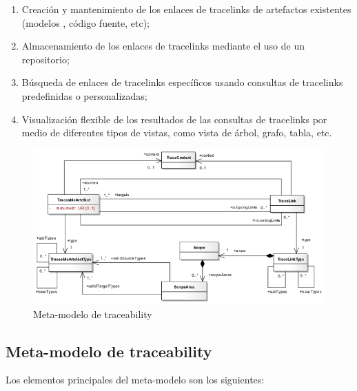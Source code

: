 \documentclass[a4paper,12pt,oneside,spanish]{book}
\begin{document}
\begin{enumerate}
\item Creación y mantenimiento de los enlaces de tracelinks de artefactos existentes (modelos , código fuente, etc);
\item Almacenamiento de los enlaces de tracelinks mediante el uso de un repositorio;
\item Búsqueda de enlaces de tracelinks específicos usando consultas de tracelinks predefinidas o personalizadas;
\item Visualización flexible de los resultados de las consultas de tracelinks por medio de diferentes tipos de vistas, como vista de árbol, grafo, tabla, etc.
\end{enumerate}

\begin{figure}[hbtp]
\centering
\includegraphics[scale=.6]{./img/Traceability_Metamodel}
\caption{Meta-modelo de traceability}
\label{fig:SPLMeta-modelo}
\end{figure}

\subsection{Meta-modelo de traceability}

Los elementos principales del meta-modelo son los siguientes:
\end{document}
